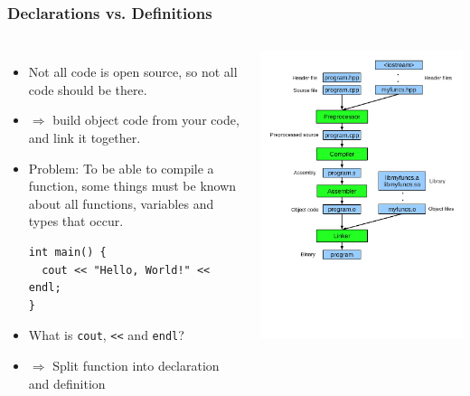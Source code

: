 \documentclass{slides}
\begin{document}
\begin{frame}[fragile]
  \frametitle{Declarations vs. Definitions}
  \begin{columns}[T,onlytextwidth]
    \begin{itemize}
    \item Not all code is open source, so not all code should be there.
    \item $\Rightarrow$ build object code from your code, and link it
      together.
    \item Problem: To be able to compile a function, some things must be
      known about all functions, variables and types that occur.
\begin{lstlisting}
int main() {
  cout << "Hello, World!" << endl;
}    
\end{lstlisting}
    \item What is \lstinline!cout!, \lstinline!<<! and \lstinline!endl!?
    \item $\Rightarrow$ Split function into declaration and definition
    \end{itemize}

    \includegraphics[height=1.1\textheight]{compilation}
  \end{columns}
\end{frame}
\end{document}
